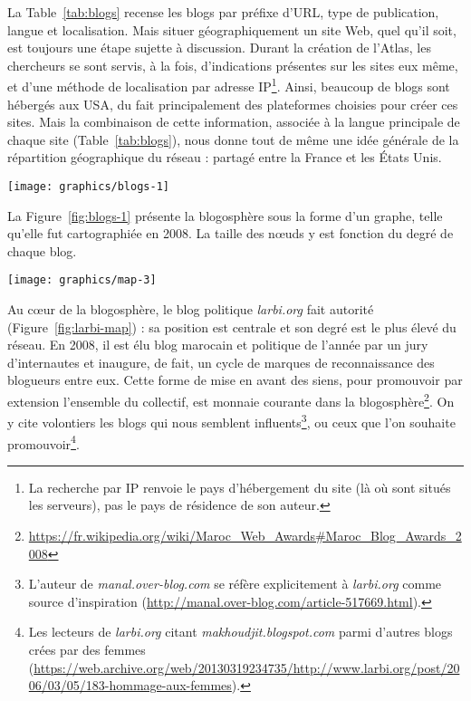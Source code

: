 \documentclass[symmetric,justified,marginals=raggedouter]{tufte-book}
\begin{document}
La Table~\ref{tab:blogs} recense les blogs par préfixe d'URL, type de publication, langue et localisation. Mais situer géographiquement un site Web, quel qu'il soit, est toujours une étape sujette à discussion. Durant la création de l'Atlas, les chercheurs se sont servis, à la fois, d'indications présentes sur les sites eux même, et d'une méthode de localisation par adresse IP\footnote{\RaggedOuter La recherche par IP renvoie le pays d'hébergement du site (là où sont situés les serveurs), pas le pays de résidence de son auteur.}. Ainsi, beaucoup de blogs sont hébergés aux USA, du fait principalement des plateformes choisies pour créer ces sites. Mais la combinaison de cette information, associée à la langue principale de chaque site (Table~\ref{tab:blogs}), nous donne tout de même une idée générale de la répartition géographique du réseau : partagé entre la France et les États Unis.

\begin{figure*}
  \texttt{[image: graphics/blogs-1]}
  \caption{La blogosphère marocaine en 2008}
  \label{fig:blogs-1}
\end{figure*}

\noindent La Figure~\ref{fig:blogs-1} présente la blogosphère sous la forme d'un graphe, telle qu'elle fut cartographiée en 2008. La taille des nœuds y est fonction du degré de chaque blog. 

\begin{marginfigure}%
  \vspace*{2cm} 
  \texttt{[image: graphics/map-3]}
  \vspace*{0.2cm}  
  \caption{\textit{larbi.org} (rouge) dans l'e-Diaspora marocaine}
  \label{fig:larbi-map}
\end{marginfigure} 

Au cœur de la blogosphère, le blog politique \textit{larbi.org} fait autorité (Figure~\ref{fig:larbi-map}) : sa position est centrale et son degré est le plus élevé du réseau. En 2008, il est élu blog marocain et politique de l'année par un jury d'internautes et inaugure, de fait, un cycle de marques de reconnaissance des blogueurs entre eux. Cette forme de mise en avant des siens, pour promouvoir par extension l'ensemble du collectif, est monnaie courante dans la blogosphère\footnote{\RaggedOuter \url{https://fr.wikipedia.org/wiki/Maroc\_Web\_Awards\#Maroc\_Blog\_Awards\_2008}}. On y cite volontiers les blogs qui nous semblent influents\footnote{\RaggedOuter L'auteur de \textit{manal.over-blog.com} se réfère explicitement à \textit{larbi.org} comme source d'inspiration (\url{http://manal.over-blog.com/article-517669.html}).}, ou  ceux que l'on souhaite promouvoir\footnote{\RaggedOuter Les lecteurs de \textit{larbi.org} citant \textit{makhoudjit.blogspot.com} parmi d'autres blogs crées par des femmes  (\url{https://web.archive.org/web/20130319234735/http://www.larbi.org/post/2006/03/05/183-hommage-aux-femmes}).}.
\end{document}
